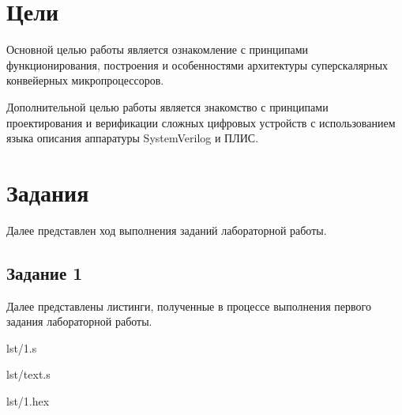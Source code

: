 \documentclass[a4paper,oneside,14pt]{extarticle}
\begin{document}

\setcounter{page}{2}
\renewcommand{\contentsname}{СОДЕРЖАНИЕ}
\tableofcontents

\newpage

\section{Цели}

Основной целью работы является ознакомление с принципами функционирования, построения и особенностями архитектуры суперскалярных конвейерных микропроцессоров.

Дополнительной целью работы является знакомство с принципами проектирования и верификации сложных цифровых устройств с использованием языка описания аппаратуры SystemVerilog и ПЛИС.

\section{Задания}

Далее представлен ход выполнения заданий лабораторной работы.

\subsection{Задание 1}

Далее представлены листинги, полученные в процессе выполнения первого задания лабораторной работы.

\begin{code}
\begin{lstinputlisting}[
        label={lst:1},
        caption={Код программы по варианту на языке ассемблера}
    ]{lst/1.s}
\end{lstinputlisting}
\end{code}

\begin{code}
\begin{lstinputlisting}[
        label={lst:1},
        caption={Дизассемблированный листинг кода программы по варианту}
    ]{lst/text.s}
\end{lstinputlisting}
\end{code}

\begin{code}
\begin{lstinputlisting}[
        label={lst:1},
        caption={Код программы по варианту в шестнадцатеричном представлении}
    ]{lst/1.hex}
\end{lstinputlisting}
\end{code}
\end{document}

